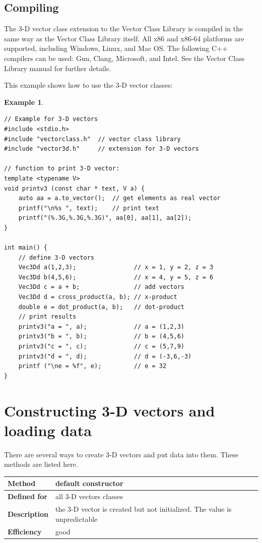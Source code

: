 \documentclass[11pt,a4paper,oneside,openright]{report}
\newtheorem{example}{Example}[chapter]  %
\newcommand{\vspacesmall}{\vspace{3mm}}
\newcommand{\vspacebig}{\vspace{6mm}}
\begin{document}
\section{Compiling} \label{Compiling}
The 3-D vector class extension to the Vector Class Library is compiled in the same way as the Vector Class Library itself. All x86 and x86-64 platforms are supported, including Windows, Linux, and Mac OS. 
The following C++ compilers can be used: Gnu, Clang, Microsoft, and Intel. 
See the Vector Class Library manual for further details.
\vspacesmall

This example shows how to use the 3-D vector classes:

\begin{example}
\label{example1}
\end{example} %
\begin{lstlisting}[frame=single]
// Example for 3-D vectors
#include <stdio.h>
#include "vectorclass.h"  // vector class library
#include "vector3d.h"     // extension for 3-D vectors

// function to print 3-D vector:
template <typename V>
void printv3 (const char * text, V a) {
    auto aa = a.to_vector();  // get elements as real vector
    printf("\n%s ", text);    // print text
    printf("(%.3G,%.3G,%.3G)", aa[0], aa[1], aa[2]);
}

int main() {
    // define 3-D vectors
    Vec3Dd a(1,2,3);                // x = 1, y = 2, z = 3
    Vec3Dd b(4,5,6);                // x = 4, y = 5, z = 6
    Vec3Dd c = a + b;               // add vectors
    Vec3Dd d = cross_product(a, b); // x-product
    double e = dot_product(a, b);   // dot-product
    // print results
    printv3("a = ", a);             // a = (1,2,3)
    printv3("b = ", b);             // b = (4,5,6)
    printv3("c = ", c);             // c = (5,7,9)
    printv3("d = ", d);             // d = (-3,6,-3)
    printf ("\ne = %f", e);         // e = 32
}
\end{lstlisting}
\vspacesmall


\chapter{Constructing 3-D vectors and loading data} 
\label{Constructing3Dvectors}

There are several ways to create 3-D vectors and put data into them. These methods are listed here.
\vspacebig

\begin{tabular}{|p{25mm}|p{100mm}|}
\hline
\bfseries Method & default constructor \\ \hline
\bfseries Defined for & all 3-D vectors classes \\ \hline
\bfseries Description & the 3-D vector is created but not initialized.\newline
The value is unpredictable \\ \hline
\bfseries Efficiency & good \\ \hline
\end{tabular}
\vspacesmall
\end{document}
